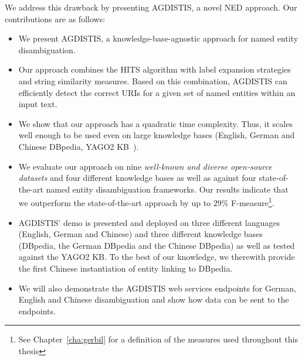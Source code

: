 We address this drawback by presenting AGDISTIS,  a novel \ac{NED} approach. Our contributions are as follows:
\begin{itemize}
\item We present AGDISTIS, a knowledge-base-agnostic approach for named entity disambiguation.
\item Our approach combines the \ac{HITS} algorithm with label expansion strategies and string similarity measures.
Based on this combination, AGDISTIS can efficiently detect the correct URIs for a given set of named entities within an input text. 
\item We show that our approach has a quadratic time complexity. Thus, it scales well enough to be used even on large knowledge bases (English, German and Chinese DBpedia, YAGO2 \ac{KB}~\cite{Yago2}).
\item We evaluate our approach on nine \emph{well-known and diverse open-source datasets} and four different knowledge bases as well as against four state-of-the-art named entity disambiguation frameworks.
Our results indicate that we outperform the state-of-the-art approach by up to $29\%$ F-measure\footnote{See Chapter~\ref{cha:gerbil} for a definition of the measures used throughout this thesis}.
\item AGDISTIS' demo is presented and deployed on three different languages (English, German and Chinese) and three different knowledge bases (DBpedia, the German DBpedia and the Chinese DBpedia) as well as tested against the YAGO2 \ac{KB}.
To the best of our knowledge, we therewith provide the first Chinese instantiation of entity linking to DBpedia.
\item We will also demonstrate the AGDISTIS web services endpoints for German, English and Chinese disambiguation and show how data can be sent to the endpoints.
\end{itemize}


